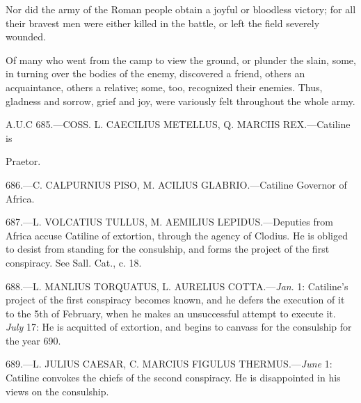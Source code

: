 Nor did the army of the Roman people obtain a joyful or bloodless
victory; for all their bravest men were either killed in the battle,
or left the field severely wounded.

Of many who went from the camp to view the ground, or plunder the
slain, some, in turning over the bodies of the enemy, discovered a
friend, others an acquaintance, others a relative; some, too,
recognized their enemies. Thus, gladness and sorrow, grief and joy,
were variously felt throughout the whole army.


A.U.C 685.—COSS. L. CAECILIUS METELLUS, Q. MARCIIS REX.—Catiline is

Praetor.

686.—C. CALPURNIUS PISO, M. ACILIUS GLABRIO.—Catiline Governor of
Africa.

687.—L. VOLCATIUS TULLUS, M. AEMILIUS LEPIDUS.—Deputies from Africa
accuse Catiline of extortion, through the agency of Clodius. He is
obliged to desist from standing for the consulship, and forms the
project of the first conspiracy. See Sall. Cat., c. 18.

688.—L. MANLIUS TORQUATUS, L. AURELIUS COTTA.—\emph{Jan}. 1: Catiline's
project of the first conspiracy becomes known, and he defers the
execution of it to the 5th of February, when he makes an unsuccessful
attempt to execute it. \emph{July} 17: He is acquitted of extortion, and
begins to canvass for the consulship for the year 690.

689.—L. JULIUS CAESAR, C. MARCIUS FIGULUS THERMUS.—\emph{June} 1:
Catiline convokes the chiefs of the second conspiracy. He is
disappointed in his views on the consulship.

